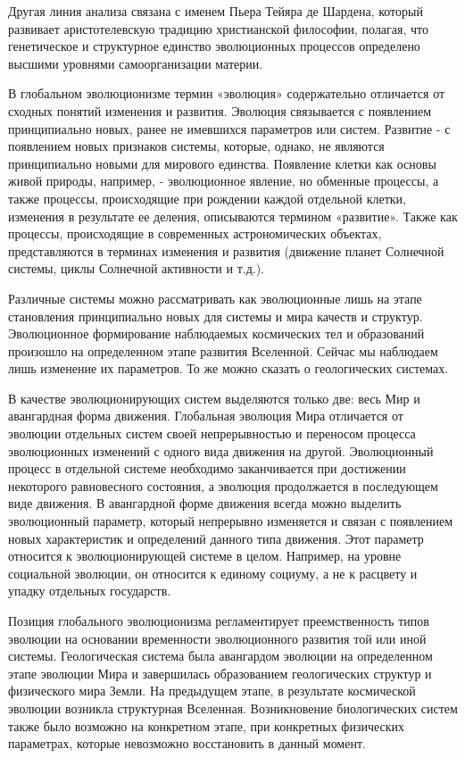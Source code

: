 \documentclass[exam_answers.tex]{subfiles}
\begin{document}
Другая линия анализа связана с именем Пьера Тейяра де Шардена,
который развивает аристотелевскую традицию христианской философии,
полагая, что генетическое и структурное единство эволюционных процессов
определено высшими уровнями самоорганизации материи.

В глобальном эволюционизме термин «эволюция» содержательно
отличается от сходных понятий изменения и развития. Эволюция связывается с
появлением принципиально новых, ранее не имевшихся параметров или
систем. Развитие - с появлением новых признаков системы, которые, однако,
не являются принципиально новыми для мирового единства. Появление клетки
как основы живой природы, например, - эволюционное явление, но обменные
процессы, а также процессы, происходящие при рождении каждой отдельной
клетки, изменения в результате ее деления, описываются термином «развитие».
Также как процессы, происходящие в современных астрономических объектах,
представляются в терминах изменения и развития (движение планет Солнечной
системы, циклы Солнечной активности и т.д.).

Различные системы можно рассматривать как эволюционные лишь на
этапе становления принципиально новых для системы и мира качеств и
структур. Эволюционное формирование наблюдаемых космических тел и
образований произошло на определенном этапе развития Вселенной. Сейчас
мы наблюдаем лишь изменение их параметров. То же можно сказать о
геологических системах.

В качестве эволюционирующих систем выделяются только две: весь Мир и
авангардная форма движения. Глобальная эволюция Мира отличается от
эволюции отдельных систем своей непрерывностью и переносом процесса
эволюционных изменений с одного вида движения на другой. Эволюционный
процесс в отдельной системе необходимо заканчивается при достижении
некоторого равновесного состояния, а эволюция продолжается в последующем
виде движения. В авангардной форме движения всегда можно выделить
эволюционный параметр, который непрерывно изменяется и связан с
появлением новых характеристик и определений данного типа движения. Этот
параметр относится к эволюционирующей системе в целом. Например, на
уровне социальной эволюции, он относится к единому социуму, а не к расцвету
и упадку отдельных государств.

Позиция глобального эволюционизма регламентирует преемственность
типов эволюции на основании временности эволюционного развития той или
иной системы. Геологическая система была авангардом эволюции на
определенном этапе эволюции Мира и завершилась образованием
геологических структур и физического мира Земли. На предыдущем этапе, в
результате космической эволюции возникла структурная Вселенная.
Возникновение биологических систем также было возможно на конкретном
этапе, при конкретных физических параметрах, которые невозможно
восстановить в данный момент.
\end{document}
